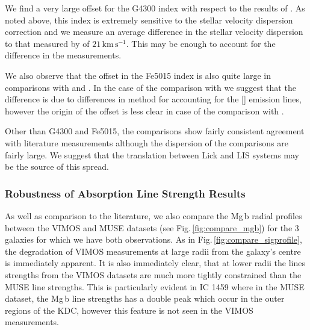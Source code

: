 			We find a very large offset for the G4300 index with respect to the results of \citet{Rampazzo2005}. As noted above, this index is extremely sensitive to the stellar velocity dispersion correction and we measure an average difference in the stellar velocity dispersion to that measured by \citet{Rampazzo2005} of $21\,\mathrm{km\,s^{-1}}$. This may be enough to account for the difference in the measurements.

			We also observe that the offset in the Fe5015 index is also quite large in comparisons with \citet{Rampazzo2005} and \citet{Vazdekis2010}. In the case of the comparison with \citet{Rampazzo2005} we suggest that the difference is due to differences in method for accounting for the [] emission lines, however the origin of the offset is less clear in case of the comparison with \citet{Vazdekis2010}. 

			Other than G4300 and Fe5015, the comparisons show fairly consistent agreement with literature measurements although the dispersion of the comparisons are fairly large. We suggest that the translation between Lick and LIS systems may be the source of this spread.


		\subsubsection{Robustness of Absorption Line Strength Results}
			\label{subsubsec:RobustAbs}
			As well as comparison to the literature, we also compare the Mg\,b radial profiles between the VIMOS and MUSE datasets (see Fig.\,\ref{fig:compare_mgb}) for the 3 galaxies for which we have both observations. As in Fig.\,\ref{fig:compare_sigprofile}, the degradation of VIMOS measurements at large radii from the galaxy's centre is immediately apparent. It is also immediately clear, that at lower radii the lines strengths from the VIMOS datasets are much more tightly constrained than the MUSE line strengths. This is particularly evident in IC 1459 where in the MUSE dataset, the Mg\,b line strengths has a double peak which occur in the outer regions of the KDC, however this feature is not seen in the VIMOS measurements. 

